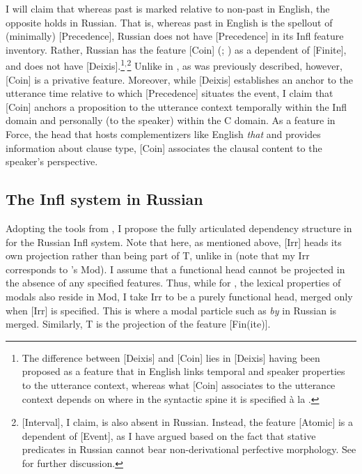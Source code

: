 \documentclass[output=paper,
modfonts,
newtxmath,
hidelinks,
]{langscibook}
\begin{document}
\noindent I will claim that whereas past is marked relative to non-past in English, the opposite holds in Russian. That is, whereas past in English is the spellout of (minimally) [Precedence], Russian does not have [Precedence] in its Infl feature inventory. Rather, Russian has the feature [Coin] (\citealt{RitterWiltschko2005}; \citealt{Wiltschko,Wiltschko2014}) as a dependent of [Finite], and does not have [Deixis].\footnote{\label{fn2}The difference between [Deixis] and [Coin] lies in [Deixis] having been proposed as a feature that in English links temporal and speaker properties to the utterance context, whereas what [Coin] associates to the utterance context depends on where in the syntactic spine it is specified à la \citet{RamchandSvenonius2014}.}$^,$\footnote{\label{fn3}[Interval], I claim, is also absent in Russian. Instead, the feature [Atomic] is a dependent of [Event], as I have argued based on the fact that stative predicates in Russian cannot bear non-derivational perfective morphology. See \citet{Melara2014} for further discussion.} Unlike in \citet{Wiltschko}, as was previously described, however, [Coin] is a privative feature. Moreover, while [Deixis] establishes an anchor to the utterance time relative to which [Precedence] situates the event, I claim that [Coin] anchors a proposition to the utterance context temporally within the Infl domain and personally (to the speaker) within the C domain. As a feature in Force, the head that hosts complementizers like English \textit{that} and provides information about clause type, [Coin] associates the clausal content to the speaker’s perspective.

\subsection{The Infl system in Russian}\label{s4.2}

Adopting the tools from \citet{Cowper2005,Cowper2010}, I propose the fully articulated dependency structure in  for the Russian Infl system. Note that here, as mentioned above, [Irr] heads its own projection rather than being part of T, unlike in \citet{Cowper2010} (note that my Irr corresponds to \citeauthor{Cowper2010}'s Mod). I assume that a functional head cannot be projected in the absence of any specified features. Thus, while for \citeauthor{Cowper2010}, the lexical properties of modals also reside in Mod, I take Irr to be a purely functional head, merged only when [Irr] is specified. This is where a modal particle such as \textit{by} in Russian is merged. Similarly, T is the projection of the feature [Fin(ite)].
\end{document}
